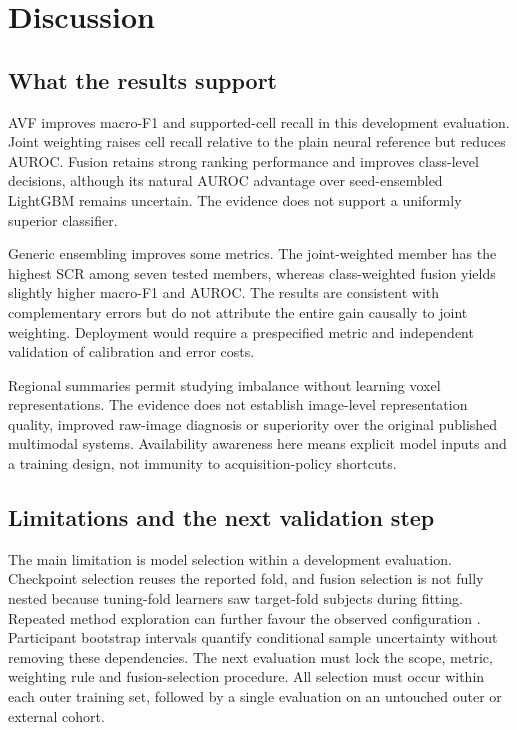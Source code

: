 \section{Discussion}
\subsection{What the results support}
AVF improves macro-F1 and supported-cell recall in this development evaluation. Joint weighting raises cell recall relative to the plain neural reference but reduces AUROC. Fusion retains strong ranking performance and improves class-level decisions, although its natural AUROC advantage over seed-ensembled LightGBM remains uncertain. The evidence does not support a uniformly superior classifier.

Generic ensembling improves some metrics. The joint-weighted member has the highest SCR among seven tested members, whereas class-weighted fusion yields slightly higher macro-F1 and AUROC. The results are consistent with complementary errors but do not attribute the entire gain causally to joint weighting. Deployment would require a prespecified metric and independent validation of calibration and error costs.

Regional summaries permit studying imbalance without learning voxel representations. The evidence does not establish image-level representation quality, improved raw-image diagnosis or superiority over the original published multimodal systems. Availability awareness here means explicit model inputs and a training design, not immunity to acquisition-policy shortcuts.

\subsection{Limitations and the next validation step}
The main limitation is model selection within a development evaluation. Checkpoint selection reuses the reported fold, and fusion selection is not fully nested because tuning-fold learners saw target-fold subjects during fitting. Repeated method exploration can further favour the observed configuration \citep{cawley2010selection}. Participant bootstrap intervals quantify conditional sample uncertainty without removing these dependencies. The next evaluation must lock the scope, metric, weighting rule and fusion-selection procedure. All selection must occur within each outer training set, followed by a single evaluation on an untouched outer or external cohort.

